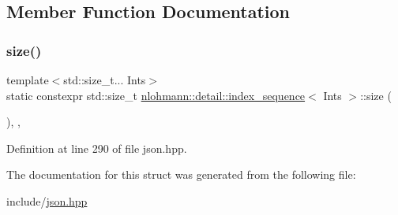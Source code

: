 \subsection{Member Function Documentation}
\mbox{\label{structnlohmann_1_1detail_1_1index__sequence_a7ac529419787d775f52408135304b337}} 
\subsubsection{\texorpdfstring{size()}{size()}}
{\footnotesize\ttfamily template$<$std\+::size\+\_\+t... Ints$>$ \\
static constexpr std\+::size\+\_\+t \hyperlink{structnlohmann_1_1detail_1_1index__sequence}{nlohmann\+::detail\+::index\+\_\+sequence}$<$ Ints $>$\+::size (\begin{DoxyParamCaption}{ }\end{DoxyParamCaption})\hspace{0.3cm}{\ttfamily [inline]}, {\ttfamily [static]}, {\ttfamily [noexcept]}}



Definition at line 290 of file json.\+hpp.



The documentation for this struct was generated from the following file\+:\begin{DoxyCompactItemize}
\item 
include/\hyperlink{json_8hpp}{json.\+hpp}\end{DoxyCompactItemize}

